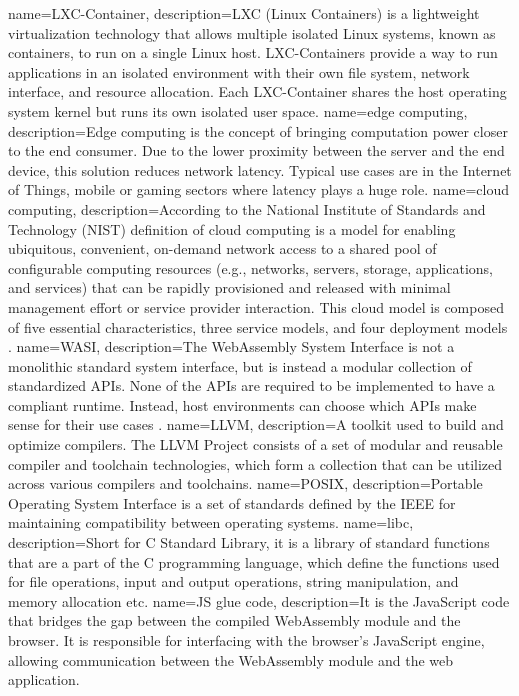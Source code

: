 {
    name=LXC-Container,
    description={LXC (Linux Containers) is a lightweight virtualization technology that allows multiple isolated Linux systems, known as containers, to run on a single Linux host. LXC-Containers provide a way to run applications in an isolated environment with their own file system, network interface, and resource allocation. Each LXC-Container shares the host operating system kernel but runs its own isolated user space.}
}
{
    name=edge computing,
    description={Edge computing is the concept of bringing computation power closer to the end consumer. Due to the lower proximity between the server and the end device, this solution reduces network latency. Typical use cases are in the Internet of Things, mobile or gaming sectors where latency plays a huge role.}
}
{
    name=cloud computing,
    description={According to the National Institute of Standards and Technology (NIST) definition of cloud computing is a model for enabling ubiquitous, convenient, on-demand network access to a shared pool of configurable computing resources (e.g., networks, servers, storage, applications, and services) that can be rapidly provisioned and released with minimal management effort or service provider interaction. This cloud model is composed of five essential characteristics, three service models, and four deployment models \cite{mell_2011_the}.}
}
{
    name=WASI,
    description={The WebAssembly System Interface is not a monolithic standard system interface, but is instead a modular collection of standardized APIs. None of the APIs are required to be implemented to have a compliant runtime. Instead, host environments can choose which APIs make sense for their use cases \cite{webassembly_2023_webassemblywasi}.}
}
{
    name=LLVM,
    description={A toolkit used to build and optimize compilers. The LLVM Project consists of a set of modular and reusable compiler and toolchain technologies, which form a collection that can be utilized across various compilers and toolchains.}
}
{
    name=POSIX,
    description={Portable Operating System Interface is a set of standards defined by the IEEE for maintaining compatibility between operating systems.}
}
{
    name=libc,
    description={Short for C Standard Library, it is a library of standard functions that are a part of the C programming language, which define the functions used for file operations, input and output operations, string manipulation, and memory allocation etc.}
}
{
    name=JS glue code,
    description={It is the JavaScript code that bridges the gap between the compiled WebAssembly module and the browser. It is responsible for interfacing with the browser's JavaScript engine, allowing communication between the WebAssembly module and the web application.}
}

\makenoidxglossaries
